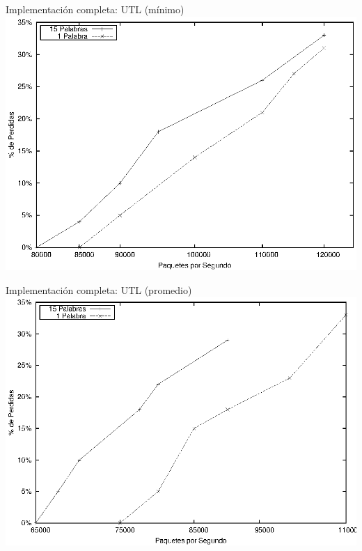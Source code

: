 \documentclass[xcolor=dvipsnames]{beamer}
\begin{document}
\begin{frame}{Implementación completa: UTL (mínimo)} 
\center	
\includegraphics[scale=0.70]{figures/utlmin.eps} 
\end{frame}


\begin{frame}{Implementación completa: UTL (promedio)} 
\center	
\includegraphics[scale=0.70]{figures/utlprom.eps} 
\end{frame}
\end{document}
